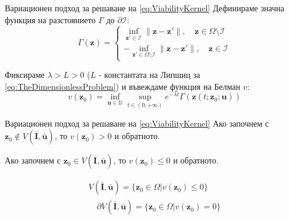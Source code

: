 \begin{frame}[t]{Вариационен подход за решаване на \eqref{eq:ViabilityKernel}}
  Дефинираме значна функция на разстоянието $\Gamma$ до $\partial \mathscr{I}$:
  \begin{equation*}
    \Gamma(\boldsymbol{z}) =
    \begin{cases}
      \inf_{\boldsymbol{z}' \in \mathscr{I}} \|\boldsymbol{z}-\boldsymbol{z}'\|, \quad \boldsymbol{z} \in \Omega \setminus \mathscr{I} \\
      -\inf_{\boldsymbol{z}' \in \Omega \setminus \mathscr{I}} \|\boldsymbol{z}-\boldsymbol{z}'\|, \quad \boldsymbol{z} \in \mathscr{I}
    \end{cases}
  \end{equation*}

  Фиксираме $\lambda>L>0$ ($L$ - константата на Липшиц за \eqref{eq:TheDimensionlessProblem}) и въвеждаме функция на Белман $v$:
  \begin{equation*}
    v(\boldsymbol{z}_0) = \inf_{\boldsymbol{u} \in \mathscr{U}} \sup_{t \in (0, +\infty)} e^{-\lambda t} \Gamma(\boldsymbol{z}(t; \boldsymbol{z}_0; \boldsymbol{u}))
  \end{equation*}
  
  \end{frame}

  \begin{frame}[t]{Вариационен подход за решаване на \eqref{eq:ViabilityKernel}}
  Ако започнем с $\boldsymbol{z}_0 \notin V(\bar{\boldsymbol{I}}, \bar{\boldsymbol{u}})$, то $v(\boldsymbol{z}_0) > 0$ и обратното.

  Ако започнем с $\boldsymbol{z}_0 \in V(\bar{\boldsymbol{I}}, \bar{\boldsymbol{u}})$, то $v(\boldsymbol{z}_0) \leq 0$ и обратното.

  \begin{equation*}
    \begin{split}
      V(\bar{\boldsymbol{I}}, \bar{\boldsymbol{u}}) = \{\boldsymbol{z}_0 \in \Omega \vert v(\boldsymbol{z}_0) \leq 0\}\\ \quad \partial V(\bar{\boldsymbol{I}}, \bar{\boldsymbol{u}}) = \{\boldsymbol{z}_0 \in \Omega \vert v(\boldsymbol{z}_0) = 0\}
    \end{split}
  \end{equation*}
\end{frame}


